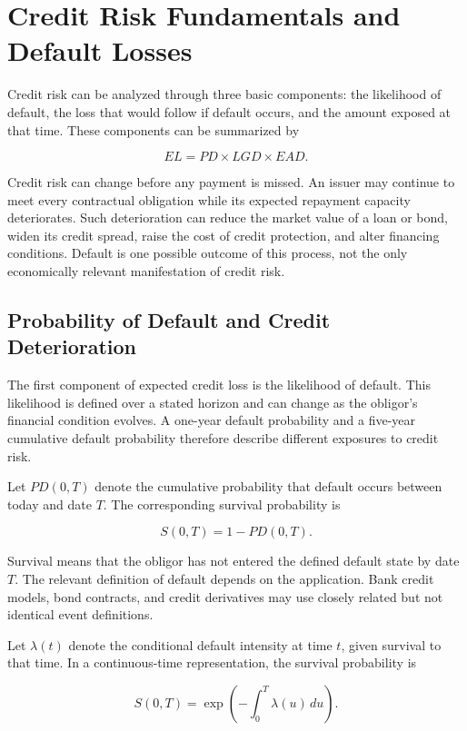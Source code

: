 \section{Credit Risk Fundamentals and Default Losses}

Credit risk can be analyzed through three basic components: the likelihood of default, the loss that would follow if default occurs, and the amount exposed at that time. These components can be summarized by

$$
EL=PD\times LGD\times EAD.
$$

Credit risk can change before any payment is missed. An issuer may continue to meet every contractual obligation while its expected repayment capacity deteriorates. Such deterioration can reduce the market value of a loan or bond, widen its credit spread, raise the cost of credit protection, and alter financing conditions. Default is one possible outcome of this process, not the only economically relevant manifestation of credit risk.


\subsection{Probability of Default and Credit Deterioration}

The first component of expected credit loss is the likelihood of default. This likelihood is defined over a stated horizon and can change as the obligor's financial condition evolves. A one-year default probability and a five-year cumulative default probability therefore describe different exposures to credit risk.

Let \(PD(0,T)\) denote the cumulative probability that default occurs between today and date \(T\). The corresponding survival probability is

\begin{equation*}
S(0,T)=1-PD(0,T).
\label{eq:ch19-survival-probability}
\end{equation*}

Survival means that the obligor has not entered the defined default state by date \(T\). The relevant definition of default depends on the application. Bank credit models, bond contracts, and credit derivatives may use closely related but not identical event definitions.

Let \(\lambda(t)\) denote the conditional default intensity at time \(t\), given survival to that time. In a continuous-time representation, the survival probability is

\[
S(0,T)
=\exp\left(
-\int_0^T \lambda(u)\,du
\right).
\]

